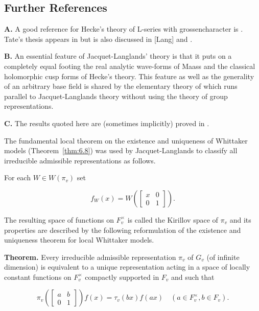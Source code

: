 \subsection*{Further References}

\textbf{A.} A good reference for Hecke's theory of L-series with grossencharacter is \cite{Godement3}. Tate's thesis appears in \cite{CasselsFrohlichs} but is also discussed in [Lang] and \cite{Goldstein}.

\textbf{B.} An essential feature of Jacquet-Langlands' theory is that it puts on a completely equal footing the real analytic wave-forms of Maass and the classical holomorphic cusp forms of Hecke's theory. This feature as well as the generality of an arbitrary base field is shared by the elementary theory of \cite{Weil2} which runs parallel to Jacquet-Langlands theory without using the theory of group representations.

\textbf{C.} The results quoted here are (sometimes implicitly) proved in \cite{JacquetLanglands}.

The fundamental local theorem on the existence and uniqueness of Whittaker models (Theorem~\ref{thm:6.8}) was used by Jacquet-Langlands to classify all irreducible admissible representations as follows.

For each $W \in W(\pi_v)$ set

\[
f_W(x) = W\!\left(\begin{bmatrix} x & 0 \\ 0 & 1 \end{bmatrix}\right).
\]

The resulting space of functions on $F_v^{\times}$ is called the Kirillov space of $\pi_v$ and its properties are described by the following reformulation of the existence and uniqueness theorem for local Whittaker models.

\textbf{Theorem.} Every irreducible admissible representation $\pi_v$ of $G_v$ (of infinite dimension) is equivalent to a unique representation acting in a space of locally constant functions on $F_v^{\times}$ compactly supported in $F_v$ and such that

\begin{equation}\label{eq:6.54}
\pi_v\!\left(\begin{bmatrix} a & b \\ 0 & 1 \end{bmatrix}\right) f(x) = \tau_v(bx)f(ax) \quad \left(a \in F_v^{\times}, b \in F_v\right).\tag{6.54}
\end{equation}


